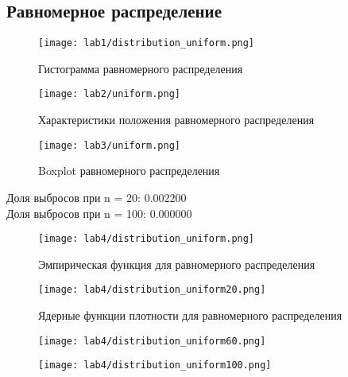 \documentclass[a4]{article}
\begin{document}
\subsection{Равномерное распределение}
	\begin{figure}[H]
	\caption{Гистограмма равномерного распределения}
	\texttt{[image: lab1/distribution\_uniform.png]}
	\end{figure}
	\begin{figure}[H]
	\caption{Характеристики положения равномерного распределения}
	\texttt{[image: lab2/uniform.png]}
	\end{figure}
	\begin{figure}[H]
	\caption{Boxplot равномерного распределения }
	\texttt{[image: lab3/uniform.png]}
	\end{figure}
	Доля выбросов при n = 20: $0.002200$\\
	Доля выбросов при n = 100: $0.000000$
	\begin{figure}[H]
	\caption{Эмпирическая функция для равномерного распределения}
	\texttt{[image: lab4/distribution\_uniform.png]}
	\end{figure}
	\begin{figure}[H]
	\caption{Ядерные функции плотности для равномерного распределения}
	\texttt{[image: lab4/distribution\_uniform20.png]}
	\end{figure}
	\begin{figure}[H]
	\texttt{[image: lab4/distribution\_uniform60.png]}
	\end{figure}
	\begin{figure}[H]
	\texttt{[image: lab4/distribution\_uniform100.png]}
	\end{figure}
\newpage
\end{document}
